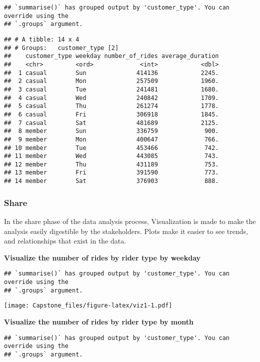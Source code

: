 \documentclass[
]{article}
\begin{document}
\begin{verbatim}
## `summarise()` has grouped output by 'customer_type'. You can override using the
## `.groups` argument.
\end{verbatim}

\begin{verbatim}
## # A tibble: 14 x 4
## # Groups:   customer_type [2]
##    customer_type weekday number_of_rides average_duration
##    <chr>         <ord>             <int>            <dbl>
##  1 casual        Sun              414136            2245.
##  2 casual        Mon              257509            1960.
##  3 casual        Tue              241481            1680.
##  4 casual        Wed              240842            1709.
##  5 casual        Thu              261274            1778.
##  6 casual        Fri              306918            1845.
##  7 casual        Sat              481689            2125.
##  8 member        Sun              336759             900.
##  9 member        Mon              400647             766.
## 10 member        Tue              453466             742.
## 11 member        Wed              443085             743.
## 12 member        Thu              431189             753.
## 13 member        Fri              391590             773.
## 14 member        Sat              376903             888.
\end{verbatim}

\hypertarget{share}{%
\subsubsection{Share}\label{share}}

In the share phase of the data analysis process, Visualization is made
to make the analysis easily digestible by the stakeholders. Plots make
it easier to see trends, and relationships that exist in the data.

\textbf{Visualize the number of rides by rider type by weekday}

\begin{verbatim}
## `summarise()` has grouped output by 'customer_type'. You can override using the
## `.groups` argument.
\end{verbatim}

\texttt{[image: Capstone\_files/figure-latex/viz1-1.pdf]}

\textbf{Visualize the number of rides by rider type by month}

\begin{verbatim}
## `summarise()` has grouped output by 'customer_type'. You can override using the
## `.groups` argument.
\end{verbatim}
\end{document}

